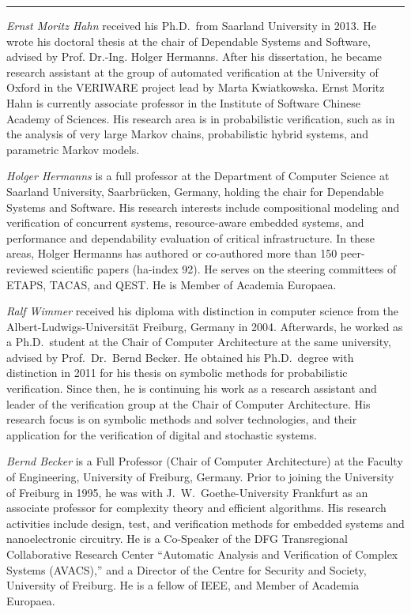 \documentclass[10pt,twocolumn]{article}
\def\qedsymbol{\rule{2mm}{2mm}}
\def\qed{\hfill{\qedsymbol}\vskip 1pt}
\begin{document}
\qed

\balance




\clearpage


\textit{Ernst Moritz Hahn} received his Ph.D.\ from Saarland University in 2013.
He wrote his
doctoral thesis at the chair of Dependable Systems and Software, advised
by Prof. Dr.-Ing. Holger Hermanns. After his dissertation, he became
research assistant at the group of automated verification at the
University of Oxford in the VERIWARE project lead by Marta Kwiatkowska.
Ernst Moritz Hahn is currently associate professor in the Institute of
Software Chinese Academy of Sciences. His research area is in
probabilistic verification, such as in the analysis of very large Markov chains,
probabilistic hybrid systems, and parametric Markov models.

\medskip

\textit{Holger Hermanns} is a full professor at the Department of Computer Science at Saarland University, Saarbr{\"u}cken, Germany, holding the chair for Dependable Systems and Software.
His research interests include compositional modeling and verification of concurrent systems, resource-aware embedded systems, and performance and dependability evaluation of critical infrastructure.
In these areas, Holger Hermanns has authored or co-authored more than 150 peer-reviewed scientific papers (ha-index 92).
He serves on the steering committees of ETAPS, TACAS, and QEST.
He is Member of Academia Europaea. 

\medskip

\textit{Ralf Wimmer} received his diploma with distinction 
in computer science from the Albert-Ludwigs-Universit\"at Freiburg, 
Germany in 2004. Afterwards, he
worked as a Ph.D.\ student at the Chair of Computer Architecture at the
same university, advised by Prof.\ Dr.\ Bernd Becker. He obtained his Ph.D.\ degree 
with distinction in 2011 for his thesis on symbolic methods for
probabilistic verification. Since then, he is continuing his work as a
research assistant and leader of the verification group at the Chair
of Computer Architecture. His research focus is on symbolic methods
and solver technologies, and their application for the verification of
digital and stochastic systems.

\medskip

\textit{Bernd Becker} is a Full Professor (Chair of Computer Architecture) at the 
Faculty of Engineering, University of Freiburg, Germany. Prior to joining the 
University of Freiburg in 1995, he was with J.~W.~Goethe-University Frankfurt as 
an associate professor for complexity theory and efficient algorithms. His 
research activities include design, test, and verification methods for embedded 
systems and  nanoelectronic circuitry. He is a Co-Speaker of the DFG 
Transregional Collaborative Research Center ``Automatic Analysis and Verification 
of Complex Systems (AVACS),'' and a Director of the Centre for Security and 
Society, University of Freiburg. He is a fellow of IEEE, and Member of Academia 
Europaea.

\balance
\end{document}
